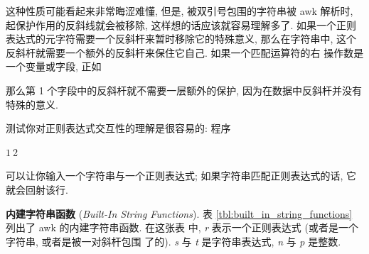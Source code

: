 这种性质可能看起来非常晦涩难懂, 但是, 被双引号包围的字符串被 awk 解析时,
起保护作用的反斜线就会被移除, 这样想的话应该就容易理解多了. 如果一个正则
表达式的元字符需要一个反斜杆来暂时移除它的特殊意义, 那么在字符串中,
这个反斜杆就需要一个额外的反斜杆来保住它自己. 如果一个匹配运算符的右
操作数是一个变量或字段, 正如
那么第 1 个字段中的反斜杆就不需要一层额外的保护, 因为在数据中反斜杆并没有
特殊的意义.

测试你对正则表达式交互性的理解是很容易的: 程序
\begin{awkcode}
    $1 ~ $2
\end{awkcode}
可以让你输入一个字符串与一个正则表达式; 如果字符串匹配正则表达式的话, 它
就会回射该行.

\textbf{内建字符串函数} (\emph{Built-In String Functions}). 表
\ref{tbl:built_in_string_functions} 列出了 awk 的内建字符串函数. 在这张表
中, \textit{r} 表示一个正则表达式 (或者是一个字符串, 或者是被一对斜杆包围
了的). \textit{s} 与 \textit{t} 是字符串表达式, \textit{n} 与 \textit{p}
是整数.
